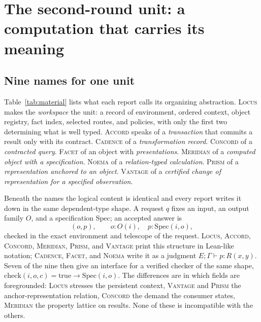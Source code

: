 \documentclass[11pt,a4paper]{article}
\newcommand{\Lc}{\textsc{Locus}}
\newcommand{\Ac}{\textsc{Accord}}
\newcommand{\Cd}{\textsc{Cadence}}
\newcommand{\Cc}{\textsc{Concord}}
\newcommand{\Fc}{\textsc{Facet}}
\newcommand{\Md}{\textsc{Meridian}}
\newcommand{\Nm}{\textsc{Noema}}
\newcommand{\Pm}{\textsc{Prism}}
\newcommand{\Vt}{\textsc{Vantage}}
\theoremstyle{definition}
\begin{document}
\section{The second-round unit: a computation that carries its meaning}\label{sec:unit}

\subsection{Nine names for one unit}
Table~\ref{tab:material} lists what each report calls its organizing abstraction. \Lc{} makes the \emph{workspace} the unit: a record of environment, ordered context, object registry, fact index, selected routes, and policies, with only the first two determining what is well typed. \Ac{} speaks of a \emph{transaction} that commits a result only with its contract. \Cd{} of a \emph{transformation record}. \Cc{} of a \emph{contracted query}. \Fc{} of an object with \emph{presentations}. \Md{} of a \emph{computed object with a specification}. \Nm{} of a \emph{relation-typed calculation}. \Pm{} of a \emph{representation anchored to an object}. \Vt{} of a \emph{certified change of representation for a specified observation}.

Beneath the names the logical content is identical and every report writes it down in the same dependent-type shape. A request $q$ fixes an input, an output family $O$, and a specification $\mathrm{Spec}$; an accepted answer is
\[
 (o,p),\qquad o:O(i),\quad p:\mathrm{Spec}(i,o),
\]
checked in the exact environment and telescope of the request. \Lc, \Ac, \Cc, \Md, \Pm, and \Vt{} print this structure in Lean-like notation; \Cd, \Fc, and \Nm{} write it as a judgment $E;\Gamma\vdash p:R(x,y)$. Seven of the nine then give an interface for a verified checker of the same shape, $\mathrm{check}(i,o,c)=\mathrm{true}\to\mathrm{Spec}(i,o)$. The differences are in which fields are foregrounded: \Lc{} stresses the persistent context, \Vt{} and \Pm{} the anchor-representation relation, \Cc{} the demand the consumer states, \Md{} the property lattice on results. None of these is incompatible with the others.
\end{document}
